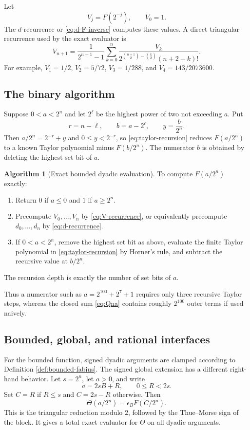 \documentclass[11pt]{article}
\numberwithin{equation}{section}
\theoremstyle{definition}
\newtheorem{algorithm}[theorem]{Algorithm}
\theoremstyle{remark}
\newcommand{\Th}{\Theta}
\begin{document}
Let
\[
 V_j=F(2^{-j}),\qquad V_0=1.
\]
The $d$-recurrence or \eqref{eq:d-F-inverse} computes these values.  A direct
triangular recurrence used by the exact evaluator is
\begin{equation}\label{eq:V-recurrence}
 V_{n+1}=\frac{1}{2^{n+1}-1}
 \sum_{k=0}^{n}
 \frac{V_k}{
 2^{\binom{n+1}{2}-\binom{k}{2}}(n+2-k)!}.
\end{equation}
For example, $V_1=1/2$, $V_2=5/72$, $V_3=1/288$, and
$V_4=143/2073600$.

\subsection{The binary algorithm}

Suppose $0<a<2^n$ and let $2^\ell$ be the highest power of two not exceeding
$a$.  Put
\[
 r=n-\ell,
 \qquad b=a-2^\ell,
 \qquad y=\frac{b}{2^n}.
\]
Then $a/2^n=2^{-r}+y$ and $0\le y<2^{-r}$, so
\eqref{eq:taylor-recursion} reduces $F(a/2^n)$ to a known Taylor polynomial
minus $F(b/2^n)$.  The numerator $b$ is obtained by deleting the highest set
bit of $a$.

\begin{algorithm}[Exact bounded dyadic evaluation]\label{alg:dyadic-bit}
To compute $F(a/2^n)$ exactly:
\begin{enumerate}
\item Return $0$ if $a\le0$ and $1$ if $a\ge2^n$.
\item Precompute $V_0,\ldots,V_n$ by \eqref{eq:V-recurrence}, or equivalently
      precompute $d_0,\ldots,d_n$ by \eqref{eq:d-recurrence}.
\item If $0<a<2^n$, remove the highest set bit as above, evaluate the finite
      Taylor polynomial in \eqref{eq:taylor-recursion} by Horner's rule, and
      subtract the recursive value at $b/2^n$.
\end{enumerate}
The recursion depth is exactly the number of set bits of $a$.
\end{algorithm}

Thus a numerator such as $a=2^{100}+2^7+1$ requires only three recursive
Taylor steps, whereas the closed sum \eqref{eq:Qna} contains roughly
$2^{100}$ outer terms if used naively.

\subsection{Bounded, global, and rational interfaces}

For the bounded function, signed dyadic arguments are clamped according to
Definition \ref{def:bounded-fabius}.  The signed global extension has a
different right-hand behavior.  Let $s=2^n$, let $a>0$, and write
\[
 a=2sB+R,
 \qquad 0\le R<2s.
\]
Set $C=R$ if $R\le s$ and $C=2s-R$ otherwise.  Then
\begin{equation}\label{eq:global-triangular-reduction}
 \Th(a/2^n)=\epsilon_B F(C/2^n).
\end{equation}
This is the triangular reduction modulo $2$, followed by the Thue--Morse sign
of the block.  It gives a total exact evaluator for $\Th$ on all dyadic
arguments.
\end{document}
